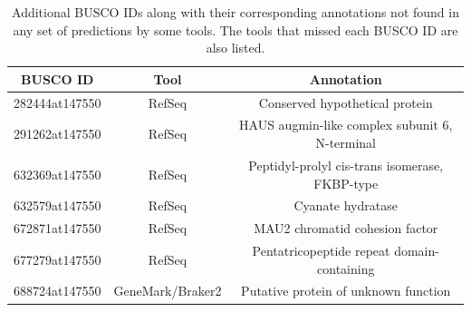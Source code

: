 \begin{table}[h]
  \centering
  \begin{tabular}{|c|c|c|}
    \hline
    BUSCO ID & Tool & Annotation \\ \hline
    282444at147550 & RefSeq & Conserved hypothetical protein \\ \hline
    291262at147550 & RefSeq & HAUS augmin-like complex subunit 6, N-terminal \\ \hline
    632369at147550 & RefSeq & Peptidyl-prolyl cis-trans isomerase, FKBP-type \\ \hline
    632579at147550 & RefSeq & Cyanate hydratase \\ \hline
    672871at147550 & RefSeq & MAU2 chromatid cohesion factor \\ \hline
    677279at147550 & RefSeq & Pentatricopeptide repeat domain-containing \\ \hline
    688724at147550 & GeneMark/Braker2 & Putative protein of unknown function \\ \hline
  \end{tabular}
  \caption[Additional missing BUSCO IDs]{Additional BUSCO IDs along with their corresponding annotations not found in any set of predictions by some tools. The tools that missed each BUSCO ID are also listed.}\label{table:missed-all-gf}
\end{table}

